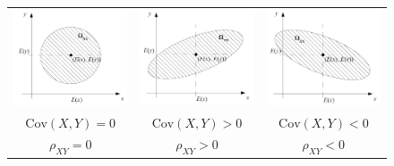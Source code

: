 \documentclass{article}
\begin{document}
\begin{figure}[htbp]
\begin{center}
\begin{tabular}{ccc}
\includegraphics[width=5cm]{cov0.png} & \includegraphics[width=5cm]{covpos.png} &
\includegraphics[width=5cm]{covneg.png} \\
$\mathrm{Cov}(X, Y)=0$ & $\mathrm{Cov}(X, Y) > 0$ & $\mathrm{Cov}(X, Y) < 0$ \\
$\rho_{XY}=0$ & $\rho_{XY}> 0$ & $\rho_{XY}< 0$
\end{tabular}
\end{center}
\end{figure}
\end{document}
